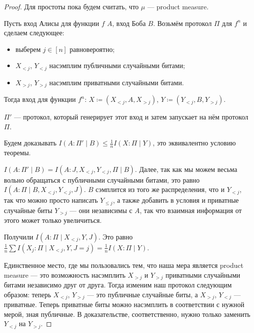 \begin{proof}
Для простоты пока будем считать, что $\mu$ --- product measure.

Пусть вход Алисы для функции $f$ $A$, вход Боба $B$. Возьмём протокол $\Pi$ для $f^n$ и сделаем следующее:

\begin{itemize}
    \item выберем $j \in [n]$ равновероятно;
    \item $X_{< j}$, $Y_{< j}$ насэмплим публичными случайными битами;
    \item $X_{> j}$, $Y_{> j}$ насэмплим приватными случайными битами.
\end{itemize}

Тогда вход для функции $f^n$: $X \coloneqq (X_{< j}, A, X_{> j})$, $Y \coloneqq (Y_{< j}, B, Y_{> j})$.

$\Pi'$ --- протокол, который генерирует этот вход и затем запускает на нём протокол $\Pi$.

Будем доказывать $I(A : \Pi' \mid B) \leq \frac{1}{n}I(X : \Pi \mid Y)$, это эквивалентно условию теоремы.

$I(A : \Pi' \mid B) = I(A : J, X_{< j}, Y_{< j}, \Pi \mid B)$. Далее, так как мы можем весьма вольно обращаться с публичными случайными битами, это равно $I(A : \Pi \mid B, X_{< j}, Y_{< j}, J)$. $B$ сэмплится из того же распределения, что и $Y_{< j}$, так что можно просто написать $Y_{\leq j}$, а также добавить в условия и приватные случайные биты $Y_{> j}$ --- они независимы с $A$, так что взаимная информация от этого может только увеличиться.

Получили $I(A : \Pi \mid X_{< j}, Y, J)$. Это равно $\frac{1}{n}\sum I(X_j : \Pi \mid X_{< j}, Y, J = j) = \frac{1}{n}I(X : \Pi \mid Y)$.

Единственное место, где мы пользовались тем, что наша мера является product measure --- это возможность насэмплить $X_{> j}$ и $Y_{> j}$ приватными случайными битами независимо друг от друга. Тогда изменим наш протокол следующим образом: теперь $X_{< j}$, $Y_{> j}$ --- это публичные случайные биты, а $X_{> j}$, $Y_{< j}$ --- приватные. Теперь приватные биты можно насэмплить в соответствии с нужной мерой, зная публичные. В доказательстве, соответственно, нужно только заменить $Y_{< j}$ на $Y_{> j}$.

\end{proof}

